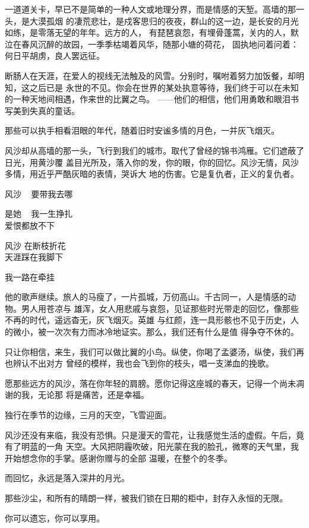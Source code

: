		一道道关卡，早已不是简单的一种人文或地理分界，而是情感的天堑。高墙的那一头，是大漠孤烟
	的凄荒悲壮，是戍客思归的夜夜，群山的这一边，是长安的月光如练，是零落无望的年年。远方的人，
	有琵琶哀怨，有埋骨蓬蒿，关内的人，默泣在春风沉醉的故园，一季季枯竭着风华，随那小塘的荷花，
	固执地问着问着：何日平胡虏，良人罢远征。

		断肠人在天涯，在爱人的视线无法触及的风雪。分别时，嘱咐着努力加饭餐，却明知，这之后已是
	永世的不见。你会在世界的某处执意等待，我们终于可以在未知的一种天地间相遇，作来世的比翼之鸟。
	——他们的相信，他们用勇敢和眼泪书写美到失真的童话。

		那些可以执手相看泪眼的年代，随着旧时安谧多情的月色，一并灰飞烟灭。

		风沙却从高墙的那一头，飞行到我们的城市。取代了曾经的锦书鸿雁。它们遮蔽了日光，用黄沙覆
	盖目光所及，落入你的发，你的眼，你的回忆。风沙无情，风沙多情，用近乎严酷灰暗的表情，哭诉大
	地的伤害。它是复仇者，正义的复仇者。

		\longpoem{}{}{}
			风沙 ~ 要带我去哪

			是她 ~ 我一生挣扎 \\
			爱恨都放不下

			风沙 在断枝折花 \\
			天涯踩在我脚下

			我一路在牵挂
		\endlongpoem

		他的歌声继续。旅人的马瘦了，一片孤城，万仞高山。千古同一，人是情感的动物。男人用苍凉与
	雄浑，女人用悲戚与哀怨，见证那些时光带走的回忆，像那些不再的时代，遥远杳无，灰飞烟灭。英雄
	与红颜，连一具形骸也不见于历史，人的微小，被一次次有力而冰冷地证实。那么，我们还有什么是值
	得争夺不休的。

		只让你相信，来生，我们可以做比翼的小鸟。纵使，你喝了孟婆汤，纵使，我们再也辨认不出对方
	曾经的模样，我也会飞到你的枝头，唱一支涕血的挽歌。

		愿那些远方的风沙，落在你年轻的肩膀。愿你记得这座城的春天，记得一个尚未凋谢的我，无论那
	将是痛苦，还是幸福。

		独行在季节的边缘，三月的天空，飞雪迎面。

		风沙还没有来临，我没有恐惧。只是漫天的雪花，让我感觉生活的虚假。午后，竟有了明蓝的一角
	天空。大风把阴霾吹破，阳光蒙在我的脸孔，微寒的天气里，我开始想念你的手掌。感谢你赠与的全部
	温暖，在整个的冬季。

		而回忆，永远是落入深井的月光。

		那些沙尘，和所有的晴朗一样，被我们锁在日期的柜中，封存入永恒的无限。

		你可以遗忘，你可以享用。

